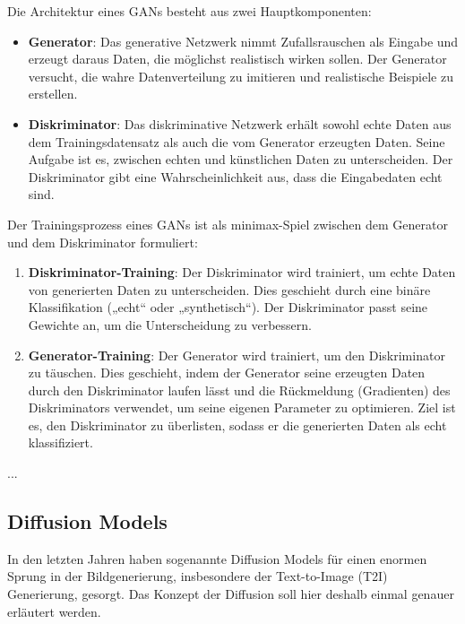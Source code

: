 Die Architektur eines GANs besteht aus zwei Hauptkomponenten:

\begin{itemize}
	\item \textbf{Generator}: Das generative Netzwerk nimmt Zufallsrauschen als Eingabe und erzeugt daraus Daten, die möglichst realistisch wirken sollen. Der Generator versucht, die wahre Datenverteilung zu imitieren und realistische Beispiele zu erstellen.
	\item \textbf{Diskriminator}: Das diskriminative Netzwerk erhält sowohl echte Daten aus dem Trainingsdatensatz als auch die vom Generator erzeugten Daten. Seine Aufgabe ist es, zwischen echten und künstlichen Daten zu unterscheiden. Der Diskriminator gibt eine Wahrscheinlichkeit aus, dass die Eingabedaten echt sind.
\end{itemize}

Der Trainingsprozess eines GANs ist als minimax-Spiel zwischen dem Generator und dem Diskriminator formuliert:

\begin{enumerate}[]
	\item \textbf{Diskriminator-Training}: Der Diskriminator wird trainiert, um echte Daten von generierten Daten zu unterscheiden. Dies geschieht durch eine binäre Klassifikation („echt“ oder „synthetisch“). Der Diskriminator passt seine Gewichte an, um die Unterscheidung zu verbessern.
	\item \textbf{Generator-Training}: Der Generator wird trainiert, um den Diskriminator zu täuschen. Dies geschieht, indem der Generator seine erzeugten Daten durch den Diskriminator laufen lässt und die Rückmeldung (Gradienten) des Diskriminators verwendet, um seine eigenen Parameter zu optimieren. Ziel ist es, den Diskriminator zu überlisten, sodass er die generierten Daten als echt klassifiziert.
\end{enumerate}

...

\subsection{Diffusion Models} \label{subsec-diffusion}

In den letzten Jahren haben sogenannte Diffusion Models für einen enormen Sprung in der Bildgenerierung, insbesondere der Text-to-Image (T2I) Generierung, gesorgt. Das Konzept der Diffusion soll hier deshalb einmal genauer erläutert werden.

